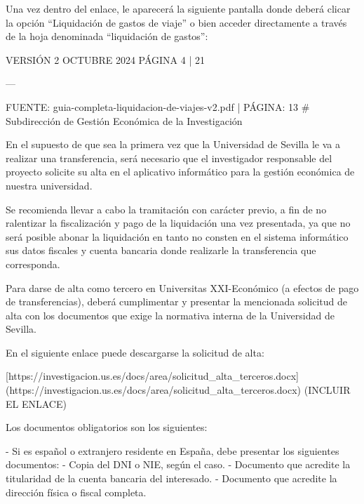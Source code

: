 \documentclass{article}
\begin{document}
\begin{itemize}
\begin{itemize}
\begin{scriptsize}
                  Una vez dentro del enlace, le aparecerá la siguiente pantalla donde deberá clicar la opción “Liquidación de gastos de viaje” o bien acceder directamente a través de la hoja denominada “liquidación de gastos”:

                  VERSIÓN 2 OCTUBRE 2024    PÁGINA 4 | 21

                  ---

                  FUENTE: guia-completa-liquidacion-de-viajes-v2.pdf | PÁGINA: 13
                  \# Subdirección de Gestión Económica de la Investigación

                  En el supuesto de que sea la primera vez que la Universidad de Sevilla le va a realizar una transferencia, será necesario que el investigador responsable del proyecto solicite su alta en el aplicativo informático para la gestión económica de nuestra universidad.

                  Se recomienda llevar a cabo la tramitación con carácter previo, a fin de no ralentizar la fiscalización y pago de la liquidación una vez presentada, ya que no será posible abonar la liquidación en tanto no consten en el sistema informático sus datos fiscales y cuenta bancaria donde realizarle la transferencia que corresponda.

                  Para darse de alta como tercero en Universitas XXI-Económico (a efectos de pago de transferencias), deberá cumplimentar y presentar la mencionada solicitud de alta con los documentos que exige la normativa interna de la Universidad de Sevilla.

                  En el siguiente enlace puede descargarse la solicitud de alta:

                  [https://investigacion.us.es/docs/area/solicitud\_alta\_terceros.docx](https://investigacion.us.es/docs/area/solicitud\_alta\_terceros.docx) (INCLUIR EL ENLACE)

                  Los documentos obligatorios son los siguientes:

                  - Si es español o extranjero residente en España, debe presentar los siguientes documentos:
                  - Copia del DNI o NIE, según el caso.
                  - Documento que acredite la titularidad de la cuenta bancaria del interesado.
                  - Documento que acredite la dirección física o fiscal completa.


\end{scriptsize}
\end{itemize}
\end{itemize}
\end{document}
